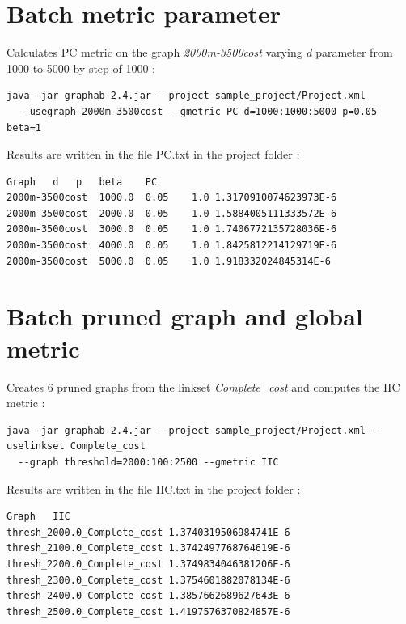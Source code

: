 \documentclass[a4paper,10pt]{report}
\begin{document}
\section{Batch metric parameter}
Calculates PC metric on the graph \textit{2000m-3500cost} varying \textit{d} parameter from 1000 to 5000 by step of 1000 :
\begin{Verbatim}
java -jar graphab-2.4.jar --project sample_project/Project.xml 
  --usegraph 2000m-3500cost --gmetric PC d=1000:1000:5000 p=0.05 beta=1
\end{Verbatim}
Results are written in the file PC.txt in the project folder :
\begin{Verbatim}
Graph	d	p	beta	PC
2000m-3500cost	1000.0	0.05	1.0	1.3170910074623973E-6
2000m-3500cost	2000.0	0.05	1.0	1.5884005111333572E-6
2000m-3500cost	3000.0	0.05	1.0	1.7406772135728036E-6
2000m-3500cost	4000.0	0.05	1.0	1.8425812214129719E-6
2000m-3500cost	5000.0	0.05	1.0	1.918332024845314E-6
\end{Verbatim}

\section{Batch pruned graph and global metric}
Creates 6 pruned graphs from the linkset \textit{Complete\_cost} and computes the IIC metric :
\begin{Verbatim}
java -jar graphab-2.4.jar --project sample_project/Project.xml --uselinkset Complete_cost
  --graph threshold=2000:100:2500 --gmetric IIC
\end{Verbatim}
Results are written in the file IIC.txt in the project folder :
\begin{Verbatim}
Graph	IIC
thresh_2000.0_Complete_cost	1.3740319506984741E-6
thresh_2100.0_Complete_cost	1.3742497768764619E-6
thresh_2200.0_Complete_cost	1.3749834046381206E-6
thresh_2300.0_Complete_cost	1.3754601882078134E-6
thresh_2400.0_Complete_cost	1.3857662689627643E-6
thresh_2500.0_Complete_cost	1.4197576370824857E-6
\end{Verbatim}
\end{document}
